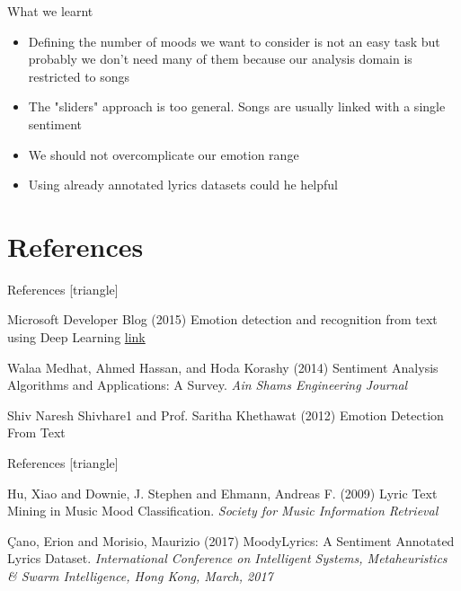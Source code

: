 \documentclass[xcolor=dvipsnames]{beamer}
\begin{document}
\begin{frame}{What we learnt}
\begin{itemize}
\item Defining the number of moods we want to consider is not an easy task but probably we don't
	need many of them because our analysis domain is restricted to songs
\item The "sliders" approach is too general. Songs are usually linked with a single sentiment
\item We should not overcomplicate our emotion range
\item Using already annotated lyrics datasets could he helpful
\end{itemize}
\end{frame}


\section{References}
\begin{frame}{References}
[triangle]
 \begin{thebibliography}{99} %
 Microsoft Developer Blog (2015)
\newblock Emotion detection and recognition from text using Deep Learning
\newblock \href{https://www.microsoft.com/developerblog/2015/11/29/emotion-detection-and-recognition-from-text-using-deep-learning/}{link}

 Walaa Medhat, Ahmed Hassan, and Hoda Korashy (2014)
\newblock Sentiment Analysis Algorithms and Applications: A Survey.
\newblock \emph{Ain Shams Engineering Journal}

 Shiv Naresh Shivhare1 and Prof. Saritha Khethawat (2012)
\newblock Emotion Detection From Text

\end{thebibliography}

\end{frame}

\begin{frame}{References}
[triangle]
 \begin{thebibliography}{99} %

Hu, Xiao and Downie, J. Stephen and Ehmann, Andreas F. (2009)
\newblock Lyric Text Mining in Music Mood Classification.
\newblock \emph{Society for Music Information Retrieval}

Çano, Erion and Morisio, Maurizio  (2017)
\newblock  MoodyLyrics: A Sentiment Annotated Lyrics Dataset.
\newblock \emph{International Conference on Intelligent Systems, Metaheuristics \& Swarm Intelligence, Hong Kong, March, 2017}

\end{thebibliography}

\end{frame}
\end{document}
